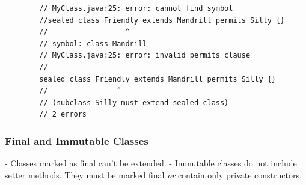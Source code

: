 \documentclass{scrartcl}
\begin{document}
    \begin{lstlisting}
        // MyClass.java:25: error: cannot find symbol
        //sealed class Friendly extends Mandrill permits Silly {}
        //                  ^
        // symbol: class Mandrill
        // MyClass.java:25: error: invalid permits clause
        //
        sealed class Friendly extends Mandrill permits Silly {}
        //                ^
        // (subclass Silly must extend sealed class)
        // 2 errors
    \end{lstlisting}
\subsubsection{Final and Immutable Classes}

    - Classes marked as final can’t be extended.
    - Immutable classes do not include setter methods. They must be marked final \textit{or} contain only private constructors.
\end{document}
